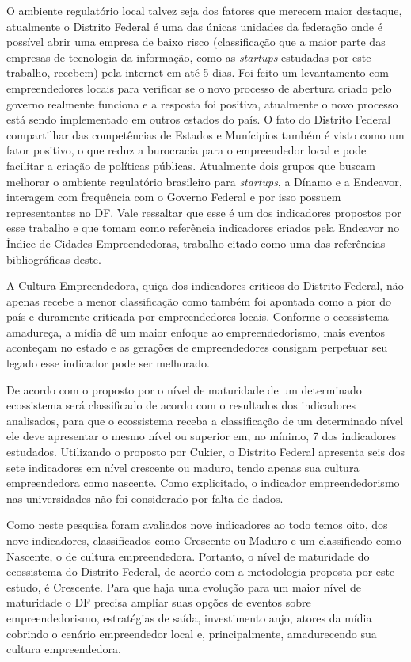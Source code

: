 O ambiente regulatório local talvez seja dos fatores que merecem maior destaque, atualmente o Distrito Federal é uma das únicas unidades da federação onde é possível abrir uma empresa de baixo risco (classificação que a maior parte das empresas de tecnologia da informação, como as \textit{startups} estudadas por este trabalho, recebem) pela internet em até 5 dias. Foi feito um levantamento com empreendedores locais para verificar se o novo processo de abertura criado pelo governo realmente funciona e a resposta foi positiva, atualmente o novo processo está sendo implementado em outros estados do país. O fato do Distrito Federal compartilhar das competências de Estados e Munícipios também é visto como um fator positivo, o que reduz a burocracia para o empreendedor local e pode facilitar a criação de políticas públicas. Atualmente dois grupos que buscam melhorar o ambiente regulatório brasileiro para \textit{startups}, a Dínamo e a Endeavor, interagem com frequência com o Governo Federal e por isso possuem representantes no DF. Vale ressaltar que esse é um dos indicadores propostos por esse trabalho e que tomam como referência indicadores criados pela Endeavor no Índice de Cidades Empreendedoras, trabalho citado como uma das referências bibliográficas deste.

A Cultura Empreendedora, quiça dos indicadores criticos do Distrito Federal, não apenas recebe a menor classificação como também foi apontada como a pior do país e duramente criticada por empreendedores locais. Conforme o ecossistema amadureça, a mídia dê um maior enfoque ao empreendedorismo, mais eventos aconteçam no estado e as gerações de empreendedores consigam perpetuar seu legado esse indicador pode ser melhorado.

De acordo com o proposto por  o nível de maturidade de um determinado ecossistema será classificado de acordo com o resultados dos indicadores analisados, para que o ecossistema receba a classificação de um determinado nível ele deve apresentar o mesmo nível ou superior em, no mínimo, 7 dos indicadores estudados. Utilizando o proposto por Cukier, o Distrito Federal apresenta seis dos sete indicadores em nível crescente ou maduro, tendo apenas sua cultura empreendedora como nascente. Como explicitado, o indicador 
empreendedorismo nas universidades não foi considerado por falta de dados. 

Como neste pesquisa foram avaliados nove indicadores ao todo temos oito, dos nove indicadores, classificados como Crescente ou Maduro e um classificado como Nascente, o de cultura empreendedora. Portanto, o nível de maturidade do ecossistema do Distrito Federal, de acordo com a metodologia proposta por este estudo, é Crescente. Para que haja uma evolução para um maior nível de maturidade o DF precisa ampliar suas opções de eventos sobre empreendedorismo, estratégias de saída, investimento anjo, atores da mídia cobrindo o cenário empreendedor local e, principalmente, amadurecendo sua cultura empreendedora.

